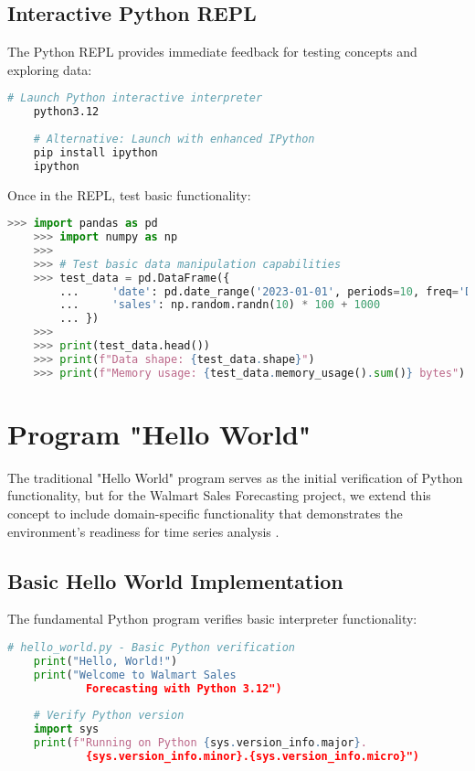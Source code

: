 \subsection{Interactive Python REPL}

The Python REPL provides immediate feedback for testing concepts and exploring data:

\begin{lstlisting}[language=bash]
	# Launch Python interactive interpreter
	python3.12
	
	# Alternative: Launch with enhanced IPython
	pip install ipython
	ipython
\end{lstlisting}

Once in the REPL, test basic functionality:

\begin{lstlisting}[language=python]
	>>> import pandas as pd
	>>> import numpy as np
	>>> 
	>>> # Test basic data manipulation capabilities
	>>> test_data = pd.DataFrame({
		...     'date': pd.date_range('2023-01-01', periods=10, freq='D'),
		...     'sales': np.random.randn(10) * 100 + 1000
		... })
	>>> 
	>>> print(test_data.head())
	>>> print(f"Data shape: {test_data.shape}")
	>>> print(f"Memory usage: {test_data.memory_usage().sum()} bytes")
\end{lstlisting}

\section{Program "Hello World"}

The traditional "Hello World" program serves as the initial verification of Python functionality, but for the Walmart Sales Forecasting project, we extend this concept to include domain-specific functionality that demonstrates the environment's readiness for time series analysis \cite{Montgomery:2008}.

\subsection{Basic Hello World Implementation}

The fundamental Python program verifies basic interpreter functionality:

\begin{lstlisting}[language=python]
	# hello_world.py - Basic Python verification
	print("Hello, World!")
	print("Welcome to Walmart Sales 
			Forecasting with Python 3.12")
	
	# Verify Python version
	import sys
	print(f"Running on Python {sys.version_info.major}.
			{sys.version_info.minor}.{sys.version_info.micro}")
\end{lstlisting}


